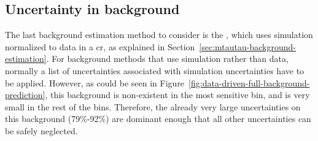 \subsection{Uncertainty in \ztautau background}
\label{simulated-background-uncertainties}

The last background estimation method to consider is the \tautau, which uses simulation normalized to data in a \gls{cr}, as explained in Section~\ref{sec:mtautau-background-estimation}. For background methods that use simulation rather than data, normally a list of uncertainties associated with simulation uncertainties have to be applied. However, as could be seen in Figure~\ref{fig:data-driven-full-background-prediction}, this background is non-existent in the most sensitive bin, and is very small in the rest of the bins. Therefore, the already very large uncertainties on this background (79\%-92\%) are dominant enough that all other uncertainties can be safely neglected.

